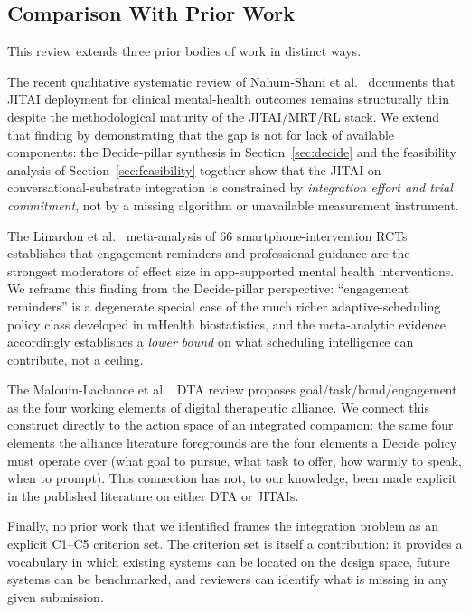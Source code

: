 \documentclass[11pt,a4paper]{article}
\newcommand{\secref}[1]{Section~\ref{#1}}
\begin{document}
\subsection{Comparison With Prior Work}\label{sec:comparison}

This review extends three prior bodies of work in distinct ways.

The recent qualitative systematic review of Nahum-Shani et
al.~\cite{NahumShani2025JITAIMHReview} documents that JITAI
deployment for clinical mental-health outcomes remains structurally
thin despite the methodological maturity of the JITAI/MRT/RL
stack. We extend that finding by demonstrating that the gap is
not for lack of available components: the Decide-pillar synthesis
in \secref{sec:decide} and the feasibility analysis of
\secref{sec:feasibility} together show that the
JITAI-on-conversational-substrate integration is constrained by
\emph{integration effort and trial commitment}, not by a missing
algorithm or unavailable measurement instrument.

The Linardon et al.~\cite{Linardon2019Meta} meta-analysis of 66
smartphone-intervention RCTs establishes that engagement reminders
and professional guidance are the strongest moderators of effect
size in app-supported mental health interventions. We reframe
this finding from the Decide-pillar perspective: ``engagement
reminders'' is a degenerate special case of the much richer
adaptive-scheduling policy class developed in mHealth
biostatistics, and the meta-analytic evidence accordingly
establishes a \emph{lower bound} on what scheduling intelligence
can contribute, not a ceiling.

The Malouin-Lachance et al.~\cite{MalouinLachance2025DTAReview}
DTA review proposes goal/task/bond/engagement as the four working
elements of digital therapeutic alliance. We connect this
construct directly to the action space of an integrated companion:
the same four elements the alliance literature foregrounds are the
four elements a Decide policy must operate over (what goal to
pursue, what task to offer, how warmly to speak, when to prompt).
This connection has not, to our knowledge, been made explicit in
the published literature on either DTA or JITAIs.

Finally, no prior work that we identified frames the integration
problem as an explicit \mbox{C1--C5} criterion set. The criterion
set is itself a contribution: it provides a vocabulary in which
existing systems can be located on the design space, future
systems can be benchmarked, and reviewers can identify what is
missing in any given submission.
\end{document}
